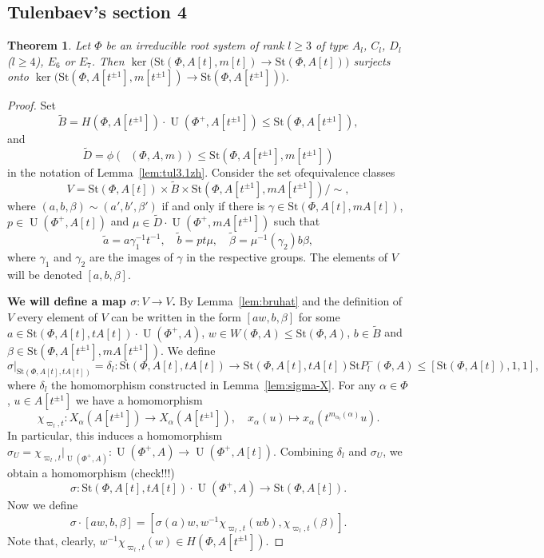 \documentclass[oneside,12pt]{amsart}
\newtheorem{thm}{Theorem}
\numberwithin{equation}{section}
\numberwithin{lem}{section}
\theoremstyle{definition}
\theoremstyle{remark}
\DeclareMathOperator{\UU}{U}
\newcommand{\Stb}{\mathrm{St}}
\DeclareMathOperator{\Stsymt}{{Sym}^t}
\begin{document}
\subsection{Tulenbaev's section 4}


\begin{thm}\label{thm:tul4.1}
Let $\Phi$ be an irreducible root system of rank $l\ge 3$ of type $A_l$, $C_l$, $D_l$ ($l\ge 4$), $E_6$ or $E_7$.
Then $\ker\bigl(\Stb(\Phi,A[t],m[t])\to\Stb(\Phi,A[t])\bigr)$ surjects onto
$\ker\bigl(\Stb(\Phi,A[t^{\pm 1}],m[t^{\pm 1}])\to\Stb(\Phi,A[t^{\pm 1}])\bigr)$.
\end{thm}
\begin{proof}
Set
$$
\tilde B=H(\Phi,A[t^{\pm 1}])\cdot\UU(\Phi^+,A[t^{\pm 1}])\le\Stb(\Phi,A[t^{\pm 1}]),
$$
and
$$
\tilde D=\phi(\Stsymt(\Phi,A,m))\le \Stb(\Phi,A[t^{\pm 1}],m[t^{\pm 1}])
$$
in the notation of Lemma~\ref{lem:tul3.1zh}. Consider the set ofequivalence classes
$$
V=\Stb(\Phi,A[t])\times \tilde B\times \Stb(\Phi,A[t^{\pm 1}],mA[t^{\pm 1}])/\sim,
$$
where $( a,b,\beta)\sim( a',b',\beta')$ if and only if there is $\gamma\in\Stb(\Phi,A[t],mA[t])$,
$p\in\UU(\Phi^+,A[t])$ and $\mu\in \tilde D\cdot\UU(\Phi^+,mA[t^{\pm 1}])$ such that
$$
\tilde a= a\gamma_1^{-1}t^{-1},\quad \tilde b=pt\mu,\quad \tilde\beta=\mu^{-1}(\gamma_2)b\beta,
$$
where $\gamma_1$ and $\gamma_2$ are the images of $\gamma$ in the respective groups. The elements of $V$
will be denoted $[ a,b,\beta]$.

{\bf We will define a map $\sigma:V\to V$.} By Lemma~\ref{lem:bruhat} and the definition of $V$ every element of $V$
can be written in the form $[ a w,b,\beta]$ for some $ a\in\Stb(\Phi,A[t],tA[t])\cdot\UU(\Phi^+,A)$,
$w\in W(\Phi,A)\le\Stb(\Phi,A)$, $b\in\tilde B$ and $\beta\in \Stb(\Phi,A[t^{\pm 1}],mA[t^{\pm 1}])$.
We define
$$
\sigma|_{\Stb(\Phi,A[t],tA[t])}=\delta_l:\Stb(\Phi,A[t],tA[t])\to\Stb(\Phi,A[t],tA[t])\Stb P_l^-(\Phi,A)\le[\Stb(\Phi,A[t]),1,1],
$$
where $\delta_l$ the homomorphism constructed in Lemma~\ref{lem:sigma-X}.
For any $\alpha\in\Phi$, $u\in A[t^{\pm 1}]$ we have a homomorphism
$$
\chi_{\varpi_l,t}:X_\alpha(A[t^{\pm 1}])\to X_\alpha(A[t^{\pm 1}]),\quad
x_\alpha(u)\mapsto x_\alpha(t^{m_{\alpha_l}(\alpha)}u).
$$
In particular, this induces a homomorphism
$\sigma_U=\chi_{\varpi_l,t}|_{\UU(\Phi^+,A)}:\UU(\Phi^+,A)\to \UU(\Phi^+,A[t])$.
Combining $\delta_l$ and $\sigma_U$, we obtain a homomorphism (check!!!)
$$
\sigma:\Stb(\Phi,A[t],tA[t])\cdot\UU(\Phi^+,A)\to \Stb(\Phi,A[t]).
$$
Now we define
$$
\sigma\cdot[ a w,b,\beta]=[\sigma( a)w,w^{-1}\chi_{\varpi_l,t}(wb),\chi_{\varpi_l,t}(\beta)].
$$
Note that, clearly, $w^{-1}\chi_{\varpi_l,t}(w)\in H(\Phi,A[t^{\pm 1}])$.


\end{proof}
\end{document}
